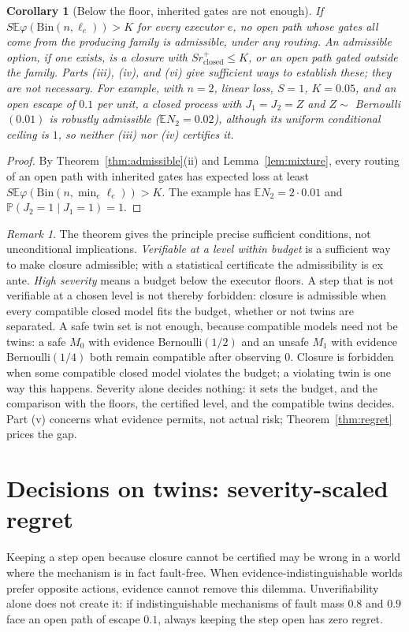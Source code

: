 \documentclass[11pt]{article}
\newtheorem{corollary}[theorem]{Corollary}
\theoremstyle{definition}
\theoremstyle{remark}
\newtheorem{remark}[theorem]{Remark}
\newcommand{\Prb}{\mathbb P}
\newcommand{\E}{\mathbb E}
\newcommand{\Bin}{\mathrm{Bin}}
\begin{document}
\begin{corollary}[Below the floor, inherited gates are not enough]\label{cor:exogenous}
If $S\E\varphi(\Bin(n,\ell_e))>K$ for every executor $e$, no open path whose gates all come from the
producing family is admissible, under any routing. An admissible option, if one exists, is a closure
with $Sr_{\mathrm{closed}}^+\le K$, or an open path gated outside the family. Parts (iii), (iv), and (vi)
give sufficient ways to establish these; they are not necessary. For example, with $n=2$, linear loss,
$S=1$, $K=0.05$, and an open escape of $0.1$ per unit, a closed process with $J_1=J_2=Z$ and
$Z\sim$ Bernoulli$(0.01)$ is robustly admissible ($\E N_2=0.02$), although its uniform conditional ceiling is
$1$, so neither (iii) nor (iv) certifies it.
\end{corollary}
\begin{proof}
By Theorem~\ref{thm:admissible}(ii) and Lemma~\ref{lem:mixture}, every routing of an open path with
inherited gates has expected loss at least $S\E\varphi(\Bin(n,\min_e\ell_e))>K$. The example has
$\E N_2=2\cdot0.01$ and $\Prb(J_2=1\mid J_1=1)=1$.
\end{proof}

\begin{remark}
The theorem gives the principle precise sufficient conditions, not unconditional implications.
\emph{Verifiable at a level within budget} is a sufficient way to make closure admissible; with a
statistical certificate the admissibility is ex ante. \emph{High severity} means a budget below the executor floors.
A step that is not verifiable at a chosen level is not thereby forbidden: closure is admissible when
every compatible closed model fits the budget, whether or not twins are separated. A safe twin set is
not enough, because compatible models need not be twins: a safe $M_0$ with evidence Bernoulli$(1/2)$ and
an unsafe $M_1$ with evidence Bernoulli$(1/4)$ both remain compatible after observing $0$. Closure is
forbidden when some compatible closed model violates the budget; a violating twin is one way this
happens. Severity alone decides nothing: it sets the budget, and the comparison
with the floors, the certified level, and the compatible twins decides. Part (v) concerns what evidence
permits, not actual risk; Theorem~\ref{thm:regret} prices the gap.
\end{remark}

\section{Decisions on twins: severity-scaled regret}\label{sec:regret}
Keeping a step open because closure cannot be certified may be wrong in a world where the
mechanism is in fact fault-free. When evidence-indistinguishable worlds prefer opposite actions,
evidence cannot remove this dilemma. Unverifiability alone does not create it: if indistinguishable
mechanisms of fault mass $0.8$ and $0.9$ face an open path of escape $0.1$, always keeping the step
open has zero regret.
\end{document}
